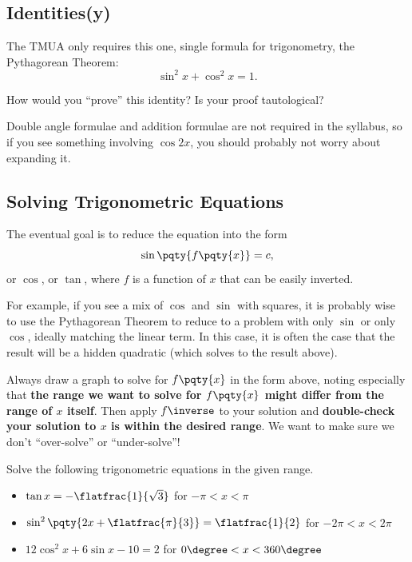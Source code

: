 \documentclass{article}
\begin{document}
\subsection{Identities(y)}

The TMUA only requires this one, single formula for trigonometry, the Pythagorean Theorem:
\[
    \sin^2 x + \cos^2 x = 1.
\]

\begin{problem}
    How would you ``prove'' this identity? Is your proof tautological?
\end{problem}

Double angle formulae and addition formulae are not required in the syllabus, so if you see something involving \(\cos 2x\), you should probably not worry about expanding it.

\subsection{Solving Trigonometric Equations}

The eventual goal is to reduce the equation into the form
\[
    \sin \pqty{f\pqty{x}} = c,
\]
or \(\cos\), or \(\tan\), where \(f\) is a function of \(x\) that can be easily inverted.

For example, if you see a mix of \(\cos\) and \(\sin\) with squares, it is probably wise to use the Pythagorean Theorem to reduce to a problem with only \(\sin\) or only \(\cos\), ideally matching the linear term. In this case, it is often the case that the result will be a hidden quadratic (which solves to the result above).

Always draw a graph to solve for \(f\pqty{x}\) in the form above, noting especially that \textbf{the range we want to solve for \(f\pqty{x}\) might differ from the range of \(x\) itself}. Then apply \(f\inverse\) to your solution and \textbf{double-check your solution to \(x\) is within the desired range}. We want to make sure we don't ``over-solve'' or ``under-solve''!

\begin{examples}
    Solve the following trigonometric equations in the given range.
    \begin{itemize}
        \item \(\tan x = - \flatfrac{1}{\sqrt{3}}\) for \(-\pi < x < \pi\)
        \item \(\sin^2 \pqty{2x + \flatfrac{\pi}{3}} = \flatfrac{1}{2}\) for \(-2 \pi < x < 2\pi\)
        \item \(12 \cos^2 x + 6 \sin x - 10 = 2\) for \(0\degree < x < 360\degree\)
    \end{itemize}
\end{examples}
\end{document}
